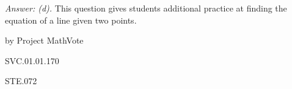 {\it Answer:  (d).}  This question gives students additional practice at finding the equation of a line given two points.

\medskip
by Project MathVote

SVC.01.01.170

STE.072
